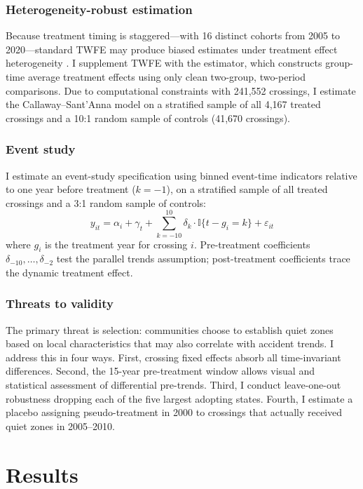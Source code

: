 \documentclass[12pt]{article}
\newcommand{\ind}{\mathbb{I}}
\begin{document}
\subsubsection*{Heterogeneity-robust estimation} Because treatment timing is staggered---with 16 distinct cohorts from 2005 to 2020---standard TWFE may produce biased estimates under treatment effect heterogeneity \citep{goodman2021difference, de2020two}. I supplement TWFE with the \citet{callaway2021difference} estimator, which constructs group-time average treatment effects using only clean two-group, two-period comparisons. Due to computational constraints with 241,552 crossings, I estimate the Callaway--Sant'Anna model on a stratified sample of all 4,167 treated crossings and a 10:1 random sample of controls (41,670 crossings).

\subsubsection*{Event study} I estimate an event-study specification using binned event-time indicators relative to one year before treatment ($k = -1$), on a stratified sample of all treated crossings and a 3:1 random sample of controls:
\begin{equation}
y_{it} = \alpha_i + \gamma_t + \sum_{k=-10}^{10} \delta_k \cdot \ind\{t - g_i = k\} + \varepsilon_{it}
\end{equation}
where $g_i$ is the treatment year for crossing $i$. Pre-treatment coefficients $\delta_{-10}, \ldots, \delta_{-2}$ test the parallel trends assumption; post-treatment coefficients trace the dynamic treatment effect.

\subsubsection*{Threats to validity} The primary threat is selection: communities choose to establish quiet zones based on local characteristics that may also correlate with accident trends. I address this in four ways. First, crossing fixed effects absorb all time-invariant differences. Second, the 15-year pre-treatment window allows visual and statistical assessment of differential pre-trends. Third, I conduct leave-one-out robustness dropping each of the five largest adopting states. Fourth, I estimate a placebo assigning pseudo-treatment in 2000 to crossings that actually received quiet zones in 2005--2010.


\section{Results}
\end{document}
